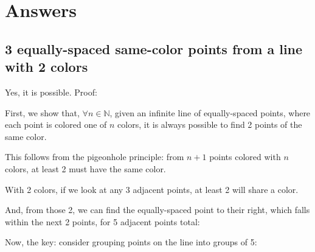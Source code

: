 \documentclass[11pt]{article}
\newcommand{\N}{\mathbb{N}}
\edef\getxnow(#1,#2){#1}
\edef\getynow(#1,#2){#2}
\newcommand*{\getx}[1]{\expandafter\getxnow#1}
\newcommand*{\gety}[1]{\expandafter\getynow#1}
\newcommand*{\scalePic}{0.4}
\newcommand*{\gridArg}[7]{%
    \foreach \x in {\fpeval{#1},\fpeval{#1+#2},...,\fpeval{#3+0.0001}} %
        \draw [black, thin, #7] (\x,\fpeval{#4}) -- (\x,\fpeval{#6+0.0001});
    \foreach \y in {\fpeval{#4},\fpeval{#4+#5},...,\fpeval{#6+0.0001}}
        \draw [black, thin, #7] (\fpeval{#1},\y) -- (\fpeval{#3+0.0001},\y);
}
\newcommand*{\grid}[6]{\gridArg{#1}{#2}{#3}{#4}{#5}{#6}{}}%
\newcommand*{\mybigbox}[4]{\grid{#1}{#3}{#1+#3}{#2}{#4}{#2+#4}} %
\newcommand*{\mybox}[2]{\mybigbox{#1}{#2}{1}{1}} %
\newcommand*{\myboxes}[1]{\foreach \pt in {#1} {\mybox{\getx{\pt}}{\gety{\pt}}}}
\begin{document}
\pagebreak
\section*{Answers}


\subsection*{3 equally-spaced same-color points from a line with 2 colors}

Yes, it is possible.
Proof:

First, we show that, $\forall n\in\N$, given an infinite line of equally-spaced points, where each point is colored one of $n$ colors, it is always possible to find 2 points of the same color.

This follows from the pigeonhole principle: from $n+1$ points colored with $n$ colors, at least 2 must have the same color.

With 2 colors, if we look at any 3 adjacent points, at least 2 will share a color.

\begin{center}
\end{center}

And, from those 2, we can find the equally-spaced point to their right, which falls within the next 2 points, for 5 adjacent points total:

\begin{center}
\end{center}

Now, the key: consider grouping points on the line into groups of 5:

\begin{center}
\end{center}
\end{document}

